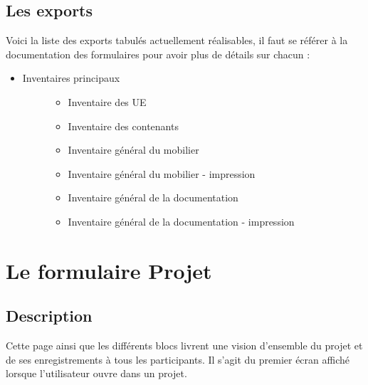 \documentclass[letterpaper,10pt,french]{sphinxmanual}
\begin{document}
\section{Les exports}
\label{manuel/interface:les-exports}
Voici la liste des exports tabulés actuellement réalisables, il faut se référer à la documentation des formulaires pour avoir plus de détails sur chacun :
\begin{itemize}
\item {} \begin{description}
\item[{Inventaires principaux}] \leavevmode\begin{itemize}
\item {} 
Inventaire des UE

\item {} 
Inventaire des contenants

\item {} 
Inventaire général du mobilier

\item {} 
Inventaire général du mobilier - impression

\item {} 
Inventaire général de la documentation

\item {} 
Inventaire général de la documentation - impression

\end{itemize}

\end{description}

\end{itemize}


\chapter{Le formulaire Projet}
\label{manuel/formulaire_projet::doc}\label{manuel/formulaire_projet:le-formulaire-projet}

\section{Description}
\label{manuel/formulaire_projet:description}
Cette page ainsi que les différents blocs livrent une vision d'ensemble du projet et de ses enregistrements à tous les participants. Il s'agit du premier écran affiché lorsque l'utilisateur ouvre dans un projet.
\end{document}
